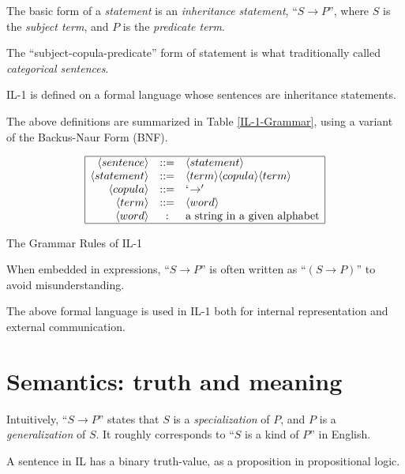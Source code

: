 \begin{defi}
The basic form of a {\em statement} is an \emph{inheritance statement}, ``\(S \rightarrow P\)'', where $S$ is the {\em subject term}, and $P$ is the {\em predicate term}.
\end{defi}

The ``subject-copula-predicate'' form of statement is what traditionally called \emph{categorical sentences}.

\begin{defi}
IL-1 is defined on a formal language whose sentences are inheritance statements.
\end{defi}

The above definitions are summarized in Table \ref{IL-1-Grammar}, using a variant of the Backus-Naur Form (BNF).
\begin{table}[htb]
\[\begin{array}{|rcl|}
\hline
\langle sentence \rangle & ::= & \langle statement \rangle \\
\langle statement \rangle & ::= & \langle term \rangle \langle copula \rangle \langle term \rangle  \\
\langle copula \rangle & ::= & `\!\rightarrow' \\
\langle term \rangle & ::= & \langle word \rangle \\
\langle word \rangle & : & \mbox{a string in a given alphabet} \\
\hline
\end{array}\]
\caption{The Grammar Rules of IL-1}
\label{IL-1-Grammar}
\end{table}

When embedded in expressions, ``\(S \rightarrow P\)'' is often written as ``\((S \rightarrow P)\)'' to avoid misunderstanding.

The above formal language is used in IL-1 both for internal representation and external communication.
 
\section{Semantics: truth and meaning}

Intuitively, ``\(S \rightarrow P\)'' states that $S$ is a {\em specialization} of $P$, and $P$ is a {\em generalization} of $S$.  It roughly corresponds to ``$S$ is a kind of $P$'' in English.

\begin{defi}
A sentence in IL has a binary truth-value, as a proposition in propositional logic.
\end{defi}

